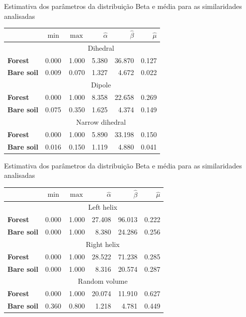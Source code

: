 \documentclass{beamer} %
\begin{document}
\begin{frame}{Estimativa dos parâmetros da distribuição Beta e média para as similaridades analisadas}
\begin{table}[hbt]
\centering
\begin{tabular}{lrrrrr}
\toprule
& $\min$ & $\max$ & $\widehat\alpha$ & $\widehat\beta$ & $\widehat\mu$\\ \midrule
& \multicolumn{5}{c}{Dihedral}\\
\cmidrule(lr){2-6}
\textbf{Forest} & 0.000 & 1.000 & 5.380 & 36.870 & 0.127\\
\textbf{Bare soil} & 0.009 & 0.070 & 1.327 & 4.672 & 0.022\\
\midrule
%
& \multicolumn{5}{c}{Dipole}\\
\cmidrule(lr){2-6}
\textbf{Forest} & 0.000 & 1.000 & 8.358 & 22.658 & 0.269\\
\textbf{Bare soil} & 0.075 & 0.350 & 1.625 & 4.374 & 0.149\\
\midrule
%
& \multicolumn{5}{c}{Narrow dihedral}\\
\cmidrule(lr){2-6}
\textbf{Forest} & 0.000 & 1.000 & 5.890 & 33.198 & 0.150\\
\textbf{Bare soil} & 0.016 & 0.150 & 1.119 & 4.880 & 0.041\\
\bottomrule
\end{tabular}
\end{table}
\end{frame}

\begin{frame}{Estimativa dos parâmetros da distribuição Beta e média para as similaridades analisadas}
\begin{table}[hbt]
\centering
\begin{tabular}{lrrrrr}
\toprule
& $\min$ & $\max$ & $\widehat\alpha$ & $\widehat\beta$ & $\widehat\mu$\\ \midrule
& \multicolumn{5}{c}{Left helix}\\
\cmidrule(lr){2-6}
\textbf{Forest} & 0.000 & 1.000 & 27.408 & 96.013 & 0.222\\
\textbf{Bare soil} & 0.000 & 1.000 & 8.380 & 24.286 & 0.256\\
\midrule
& \multicolumn{5}{c}{Right helix}\\
\cmidrule(lr){2-6}
\textbf{Forest} & 0.000 & 1.000 & 28.522 & 71.238 & 0.285\\
\textbf{Bare soil} & 0.000 & 1.000 & 8.316 & 20.574 & 0.287\\
\midrule
%
& \multicolumn{5}{c}{Random volume}\\
\cmidrule(lr){2-6}
\textbf{Forest} & 0.000 & 1.000 & 20.074 & 11.910 & 0.627\\
\textbf{Bare soil} & 0.360 & 0.800 & 1.218 & 4.781 & 0.449\\
\bottomrule
\end{tabular}
\end{table}
\end{frame}
\end{document}
